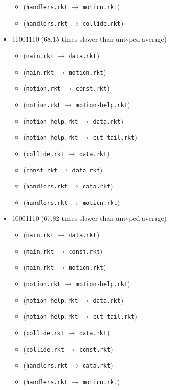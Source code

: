 \documentclass{article}
\newcommand{\mono}[1]{\texttt{#1}}
\begin{document}
\begin{itemize}
\begin{itemize}
  \item (\mono{handlers.rkt} $\rightarrow$ \mono{motion.rkt})
  \item (\mono{handlers.rkt} $\rightarrow$ \mono{collide.rkt})
  \end{itemize}
\item 11001110 (68.15 times slower than untyped average)
  \begin{itemize}
  \item (\mono{main.rkt} $\rightarrow$ \mono{data.rkt})
  \item (\mono{main.rkt} $\rightarrow$ \mono{motion.rkt})
  \item (\mono{motion.rkt} $\rightarrow$ \mono{const.rkt})
  \item (\mono{motion.rkt} $\rightarrow$ \mono{motion-help.rkt})
  \item (\mono{motion-help.rkt} $\rightarrow$ \mono{data.rkt})
  \item (\mono{motion-help.rkt} $\rightarrow$ \mono{cut-tail.rkt})
  \item (\mono{collide.rkt} $\rightarrow$ \mono{data.rkt})
  \item (\mono{const.rkt} $\rightarrow$ \mono{data.rkt})
  \item (\mono{handlers.rkt} $\rightarrow$ \mono{data.rkt})
  \item (\mono{handlers.rkt} $\rightarrow$ \mono{motion.rkt})
  \end{itemize}
\item 10001110 (67.82 times slower than untyped average)
  \begin{itemize}
  \item (\mono{main.rkt} $\rightarrow$ \mono{data.rkt})
  \item (\mono{main.rkt} $\rightarrow$ \mono{const.rkt})
  \item (\mono{main.rkt} $\rightarrow$ \mono{motion.rkt})
  \item (\mono{motion.rkt} $\rightarrow$ \mono{motion-help.rkt})
  \item (\mono{motion-help.rkt} $\rightarrow$ \mono{data.rkt})
  \item (\mono{motion-help.rkt} $\rightarrow$ \mono{cut-tail.rkt})
  \item (\mono{collide.rkt} $\rightarrow$ \mono{data.rkt})
  \item (\mono{collide.rkt} $\rightarrow$ \mono{const.rkt})
  \item (\mono{handlers.rkt} $\rightarrow$ \mono{data.rkt})
  \item (\mono{handlers.rkt} $\rightarrow$ \mono{motion.rkt})
  \end{itemize}


\end{itemize}
\end{document}
